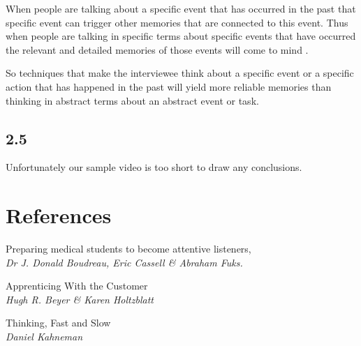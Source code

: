 When people are talking about a specific event that has occurred in the past that specific event can trigger other memories that are connected to this event. Thus when people are talking in specific terms about specific events that have occurred the relevant and detailed memories of those events will come to mind \cite{apprenticing}\cite{kahneman}.

So techniques that make the interviewee think about a specific event or a specific action that has happened in the past will yield more reliable memories than thinking in abstract terms about an abstract event or task.

\section*{2.5}

Unfortunately our sample video is too short to draw any conclusions.

\chapter{References}

\begin{thebibliography}{9}	
	Preparing medical students to become attentive listeners, \\
	\emph{Dr J. Donald Boudreau, Eric Cassell \& Abraham Fuks.}
	
	Apprenticing With the Customer \\
	\emph{Hugh R. Beyer \& Karen Holtzblatt}
	
	Thinking, Fast and Slow \\
	\emph{Daniel Kahneman}
\end{thebibliography}

\begin{thebibliography}{9}
	
\end{thebibliography}


\appendix



